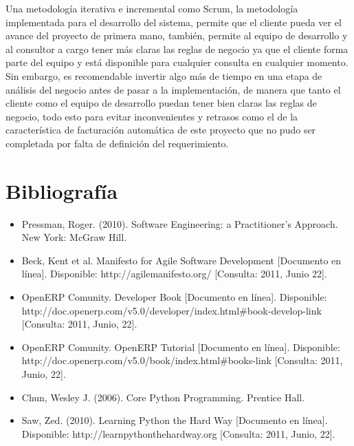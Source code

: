 \documentclass[a4paper, 12pt]{article}
\begin{document}
Una metodología iterativa e incremental como Scrum, la metodología implementada para el desarrollo del sistema, permite que el cliente pueda ver el avance del proyecto de primera mano, también, permite al equipo de desarrollo y al consultor a cargo tener más claras las reglas de negocio ya que el cliente forma parte del equipo y está disponible para cualquier consulta en cualquier momento. Sin embargo, es recomendable invertir algo más de tiempo en una etapa de análisis del negocio antes de pasar a la implementación, de manera que tanto el cliente como el equipo de desarrollo puedan tener bien claras las reglas de negocio, todo esto para evitar inconvenientes y retrasos como el de la característica de facturación automática de este proyecto que no pudo ser completada por falta de definición del requerimiento.

\newpage
\section{Bibliografía}
\begin{itemize}
    \item Pressman, Roger. (2010). Software Engineering: a Practitioner's Approach. New York: McGraw Hill.
    \item Beck, Kent et al. Manifesto for Agile Software Development [Documento en línea]. Disponible: http://agilemanifesto.org/ [Consulta: 2011, Junio 22].
    \item OpenERP Comunity. Developer Book [Documento en línea]. Disponible: http://doc.openerp.com/v5.0/developer/index.html#book-develop-link [Consulta: 2011, Junio, 22].
    \item OpenERP Comunity. OpenERP Tutorial [Documento en línea]. Disponible: http://doc.openerp.com/v5.0/book/index.html#books-link [Consulta: 2011, Junio, 22].
    \item Chun, Wesley J. (2006). Core Python Programming. Prentice Hall.
    \item Saw, Zed. (2010). Learning Python the Hard Way [Documento en línea]. Disponible: http://learnpythonthehardway.org [Consulta: 2011, Junio, 22].
\end{itemize}
\end{document}
